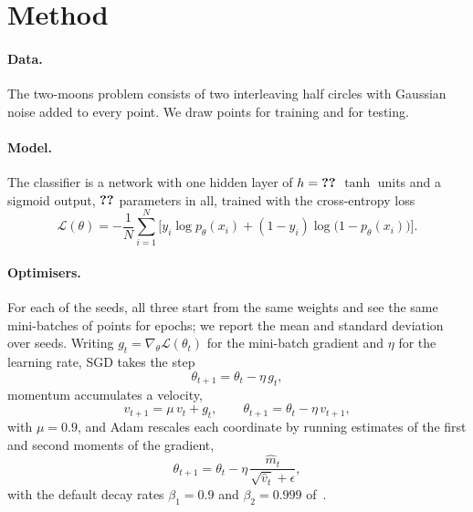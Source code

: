 \section{Method}
\label{sec:method}

\paragraph{Data.}
The two-moons problem consists of two interleaving half circles with Gaussian noise added to
every point. We draw  points for training and  for testing.

\paragraph{Model.}
The classifier is a network with one hidden layer of $h = \nbval{hidden}$ $\tanh$ units and
a sigmoid output, $\nbmath{n-params}$ parameters in all, trained with the cross-entropy loss
\begin{equation}
  \mathcal{L}(\theta) = -\frac{1}{N}\sum_{i=1}^{N}
    \Big[ y_i \log p_\theta(x_i) + (1 - y_i) \log\big(1 - p_\theta(x_i)\big) \Big].
  \label{eq:loss}
\end{equation}

\paragraph{Optimisers.}
For each of the  seeds, all three start from the same weights and see the
same mini-batches of  points for  epochs; we report the mean and
standard deviation over seeds. Writing $g_t = \nabla_\theta \mathcal{L}(\theta_t)$ for the
mini-batch gradient and $\eta$ for the learning rate, SGD takes the step
\begin{equation}
  \theta_{t+1} = \theta_t - \eta\, g_t ,
  \label{eq:sgd}
\end{equation}
momentum accumulates a velocity,
\begin{equation}
  v_{t+1} = \mu\, v_t + g_t , \qquad \theta_{t+1} = \theta_t - \eta\, v_{t+1} ,
  \label{eq:momentum}
\end{equation}
with $\mu = 0.9$, and Adam rescales each coordinate by running estimates of the first and
second moments of the gradient,
\begin{equation}
  \theta_{t+1} = \theta_t - \eta\, \frac{\hat{m}_t}{\sqrt{\hat{v}_t} + \epsilon} ,
  \label{eq:adam}
\end{equation}
with the default decay rates $\beta_1 = 0.9$ and $\beta_2 = 0.999$ of~\cite{kingma2015}.
